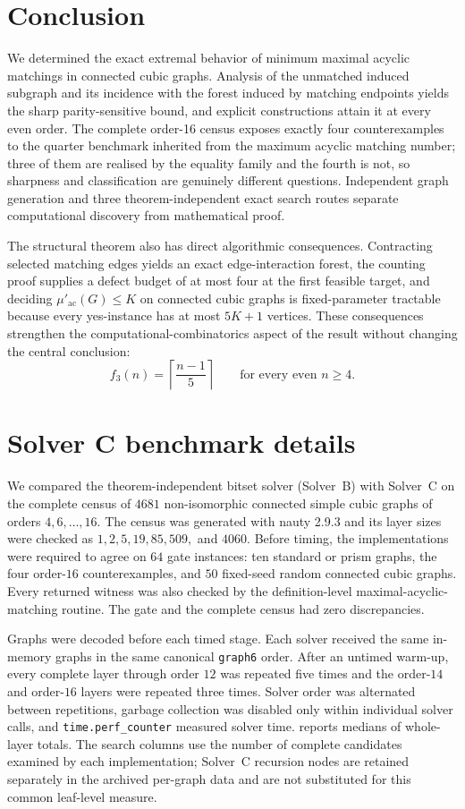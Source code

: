 \documentclass[smallextended,natbib,nospthms]{svjour3}
\theoremstyle{definition}
\theoremstyle{remark}
\newcommand{\acnum}{\mu'_{\mathrm{ac}}}
\newcommand{\ceil}[1]{\left\lceil #1\right\rceil}
\begin{document}
\section{Conclusion}
\label{sec:conclusion}

We determined the exact extremal behavior of minimum maximal acyclic matchings
in connected cubic graphs. Analysis of the unmatched induced subgraph and its
incidence with the forest induced by matching endpoints yields the sharp
parity-sensitive bound, and explicit constructions attain it at every even
order. The complete order-16 census exposes exactly four counterexamples to
the quarter benchmark inherited from the maximum acyclic matching number;
three of them are realised by the equality family and the fourth is not, so
sharpness and classification are genuinely different questions. Independent
graph generation and three theorem-independent exact search routes separate
computational discovery from mathematical proof.

The structural theorem also has direct algorithmic consequences. Contracting
selected matching edges yields an exact edge-interaction forest, the counting
proof supplies a defect budget of at most four at the first feasible target,
and deciding $\acnum(G)\leq K$ on connected cubic graphs is fixed-parameter
tractable because every yes-instance has at most $5K+1$ vertices. These
consequences strengthen the computational-combinatorics aspect of the result
without changing the central conclusion:
\[
  f_3(n)=\ceil{\frac{n-1}{5}}
  \qquad\text{for every even }n\geq 4.
\]

\appendix
\section{Solver C benchmark details}
\label{app:benchmark}

We compared the theorem-independent bitset solver (Solver~B) with Solver~C on
the complete census of $4681$ non-isomorphic connected simple cubic graphs of
orders $4,6,\ldots,16$. The census was generated with nauty 2.9.3 and its
layer sizes were checked as $1,2,5,19,85,509,$ and $4060$. Before timing, the
implementations were required to agree on $64$ gate instances: ten standard
or prism graphs, the four order-$16$ counterexamples, and $50$ fixed-seed
random connected cubic graphs. Every returned witness was also checked by the
definition-level maximal-acyclic-matching routine. The gate and the complete
census had zero discrepancies.

Graphs were decoded before each timed stage. Each solver received the same
in-memory graphs in the same canonical \texttt{graph6} order. After an untimed
warm-up, every complete layer through order $12$ was repeated five times and
the order-$14$ and order-$16$ layers were repeated three times. Solver order
was alternated between repetitions, garbage collection was disabled only
within individual solver calls, and \texttt{time.perf\_counter} measured
solver time.  reports medians of whole-layer totals.
The search columns use the number of complete candidates examined by each
implementation; Solver~C recursion nodes are retained separately in the
archived per-graph data and are not substituted for this common leaf-level
measure.
\end{document}
